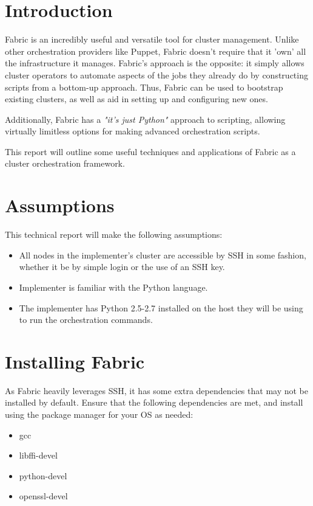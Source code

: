 \documentclass[9pt,twocolumn,twoside]{idsi}
\begin{document}
\makecoverpage

\maketitle

\section{Introduction}
Fabric is an incredibly useful and versatile tool for cluster management. Unlike other orchestration providers like Puppet, Fabric doesn't require that it 'own' all the infrastructure it manages. Fabric's approach is the opposite: it simply allows cluster operators to automate aspects of the jobs they already do by constructing scripts from a bottom-up approach. Thus, Fabric can be used to bootstrap existing clusters, as well as aid in setting up and configuring new ones.

Additionally, Fabric has a \emph{"it's just Python"} approach to scripting, allowing virtually limitless options for making advanced orchestration scripts.

This report will outline some useful techniques and applications of Fabric as a cluster orchestration framework.

\section{Assumptions}
This technical report will make the following assumptions:
\begin{itemize}
  \item All nodes in the implementer's cluster are accessible by SSH in some fashion, whether it be by simple login or the use of an SSH key.
  \item Implementer is familiar with the Python language.
  \item The implementer has Python 2.5-2.7 installed on the host they will be using to run the orchestration commands.
\end{itemize}
\section{Installing Fabric}
As Fabric heavily leverages SSH, it has some extra dependencies that may not be installed by default. Ensure that the following dependencies are met, and install using the package manager for your OS as needed:
\begin{itemize}
  \item gcc
  \item libffi-devel
  \item python-devel
  \item openssl-devel
\end{itemize}
\end{document}
